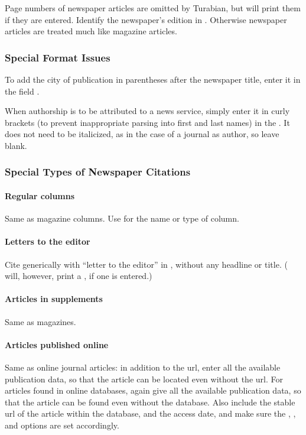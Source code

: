 \documentclass{ltxdockit}[2010/02/12]
\begin{document}
Page numbers of newspaper articles are omitted by Turabian, but  will print them if they are entered. Identify the newspaper's edition in . Otherwise newspaper articles are treated much like magazine articles.\autocites[][]{fountainrichard-westfal}

\subsubsection{Special Format Issues}
To add the city of publication in parentheses after the newspaper title, enter it in the field .\autocites[][]{seebach1996a-bold-scientis}

When authorship is to be attributed to a news service, simply enter it in curly brackets (to prevent inappropriate parsing into first and last names) in the . It does not need to be italicized, as in the case of a journal as author, so leave  blank.

\subsubsection{Special Types of Newspaper Citations}

\paragraph{Regular columns} Same as magazine columns. Use  for the name or type of column.\autocites[][]{fountainrichard-westfal}


\paragraph {Letters to the editor} Cite generically with ``letter to the editor'' in , without any headline or title. ( will, however, print a , if one is entered.)\autocites[][]{ohanlon189715}

\paragraph{Articles in supplements} Same as magazines.

\paragraph{Articles published online} \label{articleonline} Same as online journal articles: in addition to the url, enter all the available publication data, so that the article can be located even without the url. For articles found in online databases, again give all the available publication data, so that the article can be found even without the database. Also include the stable url of the article within the database, and the access date, and make sure the , , and  options are set accordingly.
\end{document}
